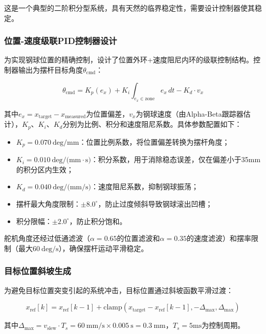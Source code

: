 \documentclass[12pt,a4paper]{ctexart}
\begin{document}
这是一个典型的二阶积分型系统，具有天然的临界稳定性，需要设计控制器使其稳定。

\subsubsection{\textbf{位置-速度级联PID控制器设计}}

为实现钢球位置的精确控制，设计了位置外环+速度阻尼内环的级联控制结构。控制器输出为摆杆目标角度$\theta_{\text{cmd}}$：

\begin{equation}
\theta_{\text{cmd}} = K_p(e_x) + K_i\int_{e_x \in \text{zone}} e_x\,dt - K_d \cdot v_x
\end{equation}

其中$e_x = x_{\text{target}} - x_{\text{measured}}$为位置偏差，$v_x$为钢球速度（由Alpha-Beta跟踪器估计），$K_p$、$K_i$、$K_d$分别为比例、积分和速度阻尼系数。具体参数配置如下：

\begin{itemize}
    \item $K_p = 0.070\ \text{deg/mm}$：位置比例系数，将位置偏差转换为摆杆角度；
    \item $K_i = 0.010\ \text{deg/(mm}\cdot\text{s)}$：积分系数，用于消除稳态误差，仅在偏差小于35mm的积分区内生效；
    \item $K_d = 0.040\ \text{deg/(mm/s)}$：速度阻尼系数，抑制钢球振荡；
    \item 摆杆最大角度限制：$\pm8.0^\circ$，防止过度倾斜导致钢球滚出凹槽；
    \item 积分限幅：$\pm2.0^\circ$，防止积分饱和。
\end{itemize}

舵机角度还经过低通滤波（$\alpha=0.65$的位置滤波和$\alpha=0.35$的速度滤波）和摆率限制（最大$60\ \text{deg/s}$），确保摆杆运动平滑稳定。

\subsubsection{\textbf{目标位置斜坡生成}}

为避免目标位置突变引起的系统冲击，目标位置通过斜坡函数平滑过渡：

\begin{equation}
x_{\text{ref}}[k] = x_{\text{ref}}[k-1] + \text{clamp}(x_{\text{target}} - x_{\text{ref}}[k-1], -\Delta_{\text{max}}, \Delta_{\text{max}})
\end{equation}

其中$\Delta_{\text{max}} = v_{\text{slew}} \cdot T_s = 60\ \text{mm/s} \times 0.005\ \text{s} = 0.3\ \text{mm}$，$T_s=5\text{ms}$为控制周期。
\end{document}
